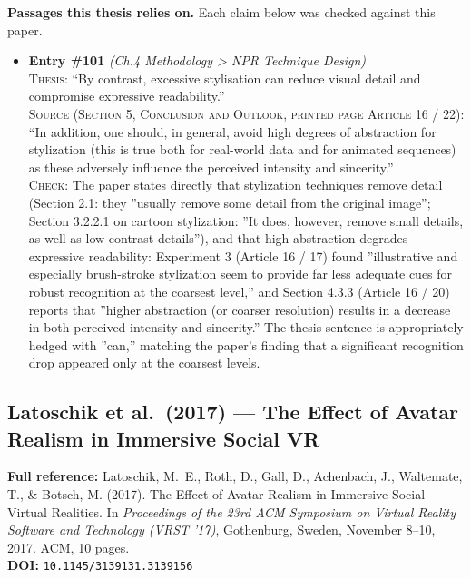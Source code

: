\documentclass[11pt, a4paper]{article}
\begin{document}
\textbf{Passages this thesis relies on.} Each claim below was checked against this paper.
\begin{itemize}[leftmargin=1.2em,itemsep=4pt]
\item \textbf{Entry \#101} \textit{(Ch.4 Methodology > NPR Technique Design)}\\
\textsc{Thesis:} ``By contrast, excessive stylisation can reduce visual detail and compromise expressive readability.''\\
\textsc{Source (Section 5, Conclusion and Outlook, printed page Article 16 / 22):} ``In addition, one should, in general, avoid high degrees of abstraction for stylization (this is true both for real-world data and for animated sequences) as these adversely influence the perceived intensity and sincerity.''\\
\textsc{Check:} The paper states directly that stylization techniques remove detail (Section 2.1: they ”usually remove some detail from the original image”; Section 3.2.2.1 on cartoon stylization: ”It does, however, remove small details, as well as low-contrast details”), and that high abstraction degrades expressive readability: Experiment 3 (Article 16 / 17) found ”illustrative and especially brush-stroke stylization seem to provide far less adequate cues for robust recognition at the coarsest level,” and Section 4.3.3 (Article 16 / 20) reports that ”higher abstraction (or coarser resolution) results in a decrease in both perceived intensity and sincerity.” The thesis sentence is appropriately hedged with ”can,” matching the paper's finding that a significant recognition drop appeared only at the coarsest levels.
\end{itemize}

\subsection{Latoschik et al.\ (2017) --- The Effect of Avatar Realism in Immersive Social VR}

\begin{refbox}
\textbf{Full reference:} Latoschik, M.~E., Roth, D., Gall, D., Achenbach, J., Waltemate, T., \& Botsch, M. (2017). The Effect of Avatar Realism in Immersive Social Virtual Realities. In \textit{Proceedings of the 23rd ACM Symposium on Virtual Reality Software and Technology (VRST '17)}, Gothenburg, Sweden, November 8--10, 2017. ACM, 10 pages.\\
\textbf{DOI:} \texttt{10.1145/3139131.3139156}
\end{refbox}
\end{document}
